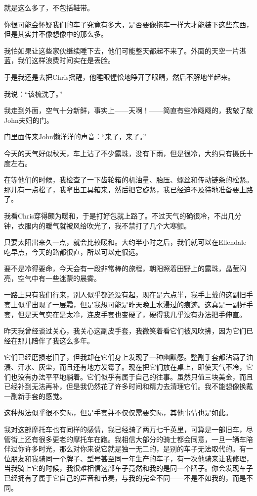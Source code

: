\documentclass[UTF8]{article}
\begin{document}
\par 就是这么多了，不包括鞋带。
\par 你很可能会怀疑我们的车子究竟有多大，是否要像拖车一样大才能装下这些东西，但是其实并不像想像中的那么多。
\par 我怕如果让这些家伙继续睡下去，他们可能整天都起不来了。外面的天空一片湛蓝，我们这样浪费时间实在是丢脸。
\par 于是我还是去把Chris摇醒，他睡眼惺忪地睁开了眼睛，然后不解地坐起来。
\par 我说：“该梳洗了。”
\par 我走到外面，空气十分新鲜，事实上——天啊！——简直有些冷飕飕的，我敲了敲John夫妇的门。
\par 门里面传来John懒洋洋的声音：“来了，来了。”
\par 今天的天气好似秋天，车上沾了不少露珠，没有下雨，但是很冷，大约只有摄氏十度左右。
\par 在等他们的时候，我检查了一下齿轮箱的机油量、胎压、螺丝和传动链条的松紧。那儿有一点松了，我拿出工具箱来，然后把它旋紧，我已经迫不及待地准备要上路了。
\par 我看Chris穿得颇为暖和，于是打好包就上路了。不过天气的确很冷，不出几分钟，衣服内的暖气就被风给吹光了，我不禁打了几个大寒颤。
\par 只要太阳出来久一点，就会比较暖和。大约半小时之后，我们就可以在Ellendale吃早点，今天的路都很直，所以可以走很远。
\par 要不是冷得要命，今天会有一段非常棒的旅程，朝阳照着田野上的露珠，晶莹闪亮，空气中有一些迷蒙的晨雾。
\par 一路上只有我们行来，别人似乎都还没有起，现在是六点半，我手上戴的这副旧手套上似乎出现了一层霜，但是我想可能是昨天晚上水浸过的痕迹。这真是一副好手套，但是天气实在是太冷，连皮手套也变硬了，硬得我几乎没有办法把手伸直。
\par 昨天我曾经谈过关心，我关心这副皮手套，我微笑着看它们被风吹拂，因为它们已经在那儿陪伴了我这么多年。
\par 它们已经磨损老旧了，但我却在它们身上发现了一种幽默感。整副手套都沾满了油渍、汗水、灰尘，而且还有地方发霉了。现在把它们放在桌上，即使天气不冷，它们也没有办法平平地躺着。它们似乎有属于自己的往事。虽然只值三块美金，而且已经补到无法再补，但是我仍然花了许多时间和精力去清理它们。我不能想像换戴一副新手套的感觉。
\par 这种想法似乎很不实际，但是手套并不仅仅需要实际，其他事情也是如此。
\par 我对这部摩托车也有同样的感情，我已经骑了两万七千英里，可算是一部旧车，尽管街上还有很多更老的摩托车在跑。我相信大部分的骑士都会同意，一旦一辆车陪伴过你许多时光，那么对你来说它就是独一无二的，是别的车子无法取代的。有一位朋友和我骑同一个牌子、型号甚至同一年生产的车子，有一次他骑来让我修理，当我骑上它的时候，我很难相信这部车子竟然和我的是同一个牌子。你会发现车子已经拥有了属于它自己的声音和节奏，与我的完全不同——不是不如我的，而是不同。
\end{document}
